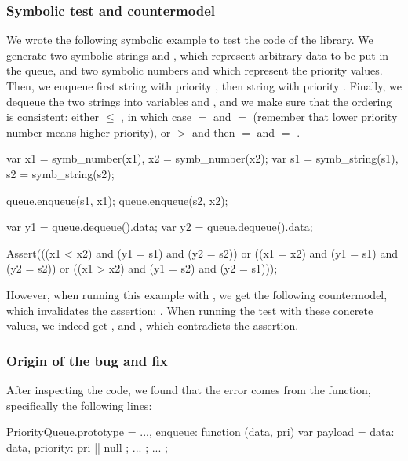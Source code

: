 \subsubsection{Symbolic test and countermodel}

We wrote the following symbolic example to test the code of the library.
We generate two symbolic strings  and , which represent arbitrary data to be put in the queue, and two symbolic numbers  and  which represent the priority values.
Then, we enqueue first string  with priority , then string  with priority .
Finally, we dequeue the two strings into variables  and , and we make sure that the ordering is consistent: either  $\leq$ , in which case  $=$  and  $=$  (remember that lower priority number means higher priority), or  $>$  and then  $=$  and  $=$ .

\begin{lstjs}
var x1 = symb_number(x1), x2 = symb_number(x2);
var s1 = symb_string(s1), s2 = symb_string(s2);

queue.enqueue(s1, x1);
queue.enqueue(s2, x2);

var y1 = queue.dequeue().data;
var y2 = queue.dequeue().data;

Assert(((x1 < x2) and (y1 = s1) and (y2 = s2)) 
    or ((x1 = x2) and (y1 = s1) and (y2 = s2))
    or ((x1 > x2) and (y1 = s2) and (y2 = s1)));
\end{lstjs}


However, when running this example with \cosette, we get the following countermodel, which invalidates the assertion: .
When running the test with these concrete values, we indeed get , and , which contradicts the assertion.

\subsubsection{Origin of the bug and fix}

After inspecting the code, we found that the error comes from the  function, specifically the following lines:

\begin{lstjs}
PriorityQueue.prototype = {
    ...,
    enqueue: function (data, pri) {
        var payload = {
            data: data,
            priority: pri || null
        };
        ...
    };
    ...
};
\end{lstjs}

